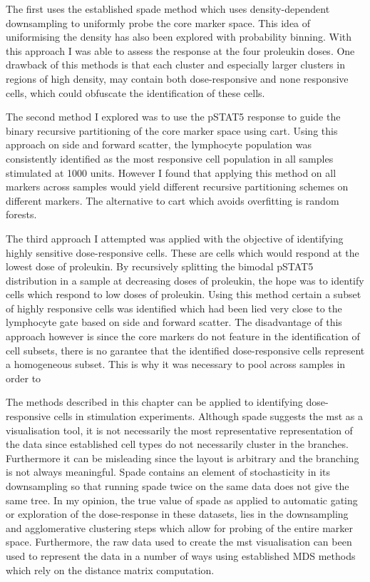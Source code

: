 The first uses the established spade method which uses density-dependent downsampling to uniformly probe the core marker space.
This idea of uniformising the density has also been explored with probability binning.
With this approach I was able to assess the response at the four proleukin doses.
One drawback of this methods is that each cluster and especially larger clusters in regions of high density, may contain both dose-responsive and none responsive cells,
which could obfuscate the identification of these cells.

The second method I explored was to use the pSTAT5 response to guide the binary recursive partitioning of the core marker space using cart.
Using this approach on side and forward scatter, the lymphocyte population was consistently identified as the most responsive cell population in all samples
stimulated at 1000 units.
However I found that applying this method on all markers across samples would yield different recursive partitioning schemes on different markers.
The alternative to cart which avoids overfitting is random forests.

The third approach I attempted was applied with the objective of identifying highly sensitive dose-responsive cells.
These are cells which would respond at the lowest dose of proleukin.
By recursively splitting the bimodal pSTAT5 distribution in a sample at decreasing doses of proleukin, the hope was to identify cells which respond to low doses of proleukin.
Using this method certain a subset of highly responsive cells was identified which had been lied very close to the lymphocyte gate based on side and forward scatter.
The disadvantage of this approach however is since the core markers do not feature in the identification of cell subsets, there is no garantee that the identified
dose-responsive cells represent a homogeneous subset.  This is why it was necessary to pool across samples in order to 

The methods described in this chapter can be applied to identifying dose-responsive cells in stimulation experiments.
Although spade suggests the mst as a visualisation tool, it is not necessarily the most representative representation of the data since
established cell types do not necessarily cluster in the branches.
Furthermore it can be misleading since the layout is arbitrary and the branching is not always meaningful.
Spade contains an element of stochasticity in its downsampling so that running spade twice on the same data does not give the same tree.
In my opinion, the true value of spade as applied to automatic gating or exploration of the dose-response in these datasets,
lies in the downsampling and agglomerative clustering steps which allow for probing of the entire marker space.
Furthermore, the raw data used to create the mst visualisation can been used to represent the data in a number of ways using established
MDS methods which rely on the distance matrix computation.

